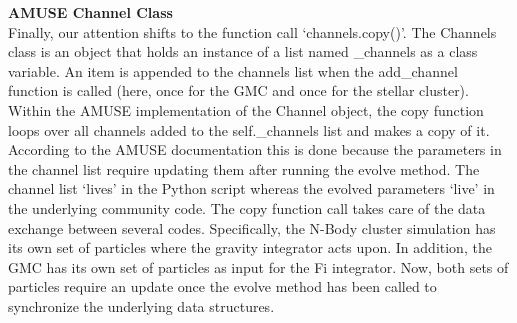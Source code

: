 \documentclass{aa}
\begin{document}


\noindent \textbf{AMUSE Channel Class} \\
Finally, our attention shifts to the function call `channels.copy()'. The Channels class is an object that holds an instance of a list named \_channels as a class variable. An item is appended to the channels list when the add\_channel function is called (here, once for the GMC and once for the stellar cluster). Within the AMUSE implementation of the Channel object, the copy function loops over all channels added to the self.\_channels list and makes a copy of it. According to the AMUSE documentation this is done because the parameters in the channel list require updating them after running the evolve method. The channel list `lives' in the Python script whereas the evolved parameters `live' in the underlying community code. The copy function call takes care of the data exchange between several codes. Specifically, the N-Body cluster simulation has its own set of particles where the gravity integrator acts upon. In addition, the GMC has its own set of particles as input for the Fi integrator. Now, both sets of particles require an update once the evolve method has been called to synchronize the underlying data structures.
\end{document}
